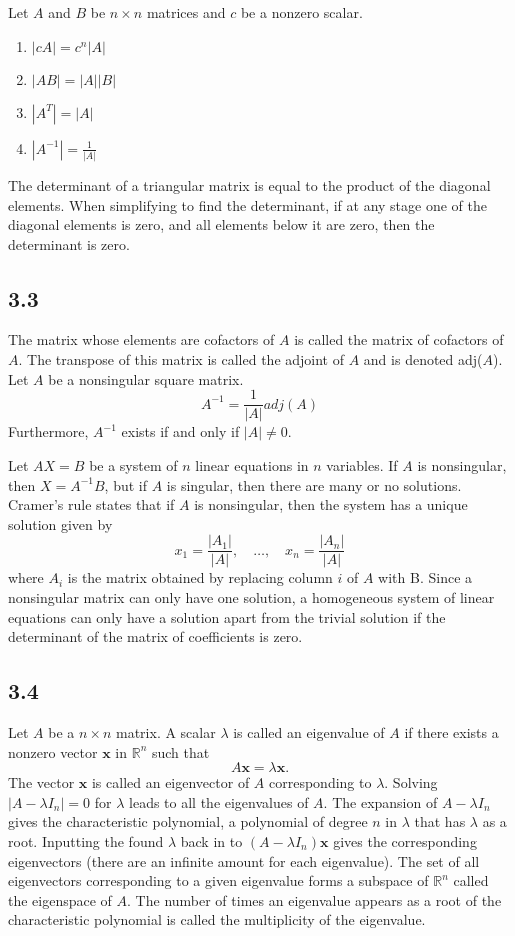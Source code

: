 \documentclass{article}
\begin{document}
    Let $A$ and $B$ be $n \times n$ matrices and $c$ be a nonzero scalar.
    \begin{enumerate}
        \item $|cA| = c^n|A|$
        \item $|AB| = |A||B|$
        \item $|A^T| = |A|$
        \item $|A^{-1}| = \frac{1}{|A|}$
    \end{enumerate}

    The determinant of a triangular matrix is equal to the product of the diagonal elements.
    When simplifying to find the determinant, if at any stage one of the diagonal elements is zero, 
    and all elements below it are zero, then the determinant is zero.

    \subsection*{3.3}
    The matrix whose elements are cofactors of $A$ is called the matrix of cofactors of $A$.
    The transpose of this matrix is called the adjoint of $A$ and is denoted adj($A$).
    Let $A$ be a nonsingular square matrix. 
    \[
    A^{-1} = \frac{1}{|A|}adj(A)
    \]
    Furthermore, $A^{-1}$ exists if and only if $|A| \neq 0$.
    
    Let $AX = B$ be a system of $n$ linear equations in $n$ variables. 
    If $A$ is nonsingular, then $X = A^{-1}B$, but if $A$ is singular, then there are many or no solutions.
    Cramer's rule states that if $A$ is nonsingular, then the system has a unique solution given by
    \[
    x_1 = \frac{|A_1|}{|A|}, \quad \dots, \quad x_n = \frac{|A_n|}{|A|}
    \]
    where $A_i$ is the matrix obtained by replacing column $i$ of $A$ with B.
    Since a nonsingular matrix can only have one solution,
    a homogeneous system of linear equations can only have a solution apart from the trivial solution
    if the determinant of the matrix of coefficients is zero. 

    \subsection*{3.4}
    Let $A$ be a $n \times n$ matrix. 
    A scalar $\lambda$ is called an eigenvalue of $A$ 
    if there exists a nonzero vector $\mathbf{x}$ in $\mathbb{R}^n$ such that
    \[
    A\mathbf{x} = \lambda \mathbf{x}.
    \]
    The vector $\mathbf{x}$ is called an eigenvector of $A$ corresponding to $\lambda$.
    Solving $|A - \lambda I_n| = 0$ for $\lambda$ leads to all the eigenvalues of $A$.
    The expansion of $A - \lambda I_n$ gives the characteristic polynomial,
    a polynomial of degree $n$ in $\lambda$ that has $\lambda$ as a root.
    Inputting the found $\lambda$ back in to $(A - \lambda I_n)\mathbf{x}$ 
    gives the corresponding eigenvectors (there are an infinite amount for each eigenvalue).
    The set of all eigenvectors corresponding to a given eigenvalue 
    forms a subspace of $\mathbb{R}^n$ called the eigenspace of $A$. 
    The number of times an eigenvalue appears as a root of the characteristic polynomial 
    is called the  multiplicity of the eigenvalue.
\end{document}
